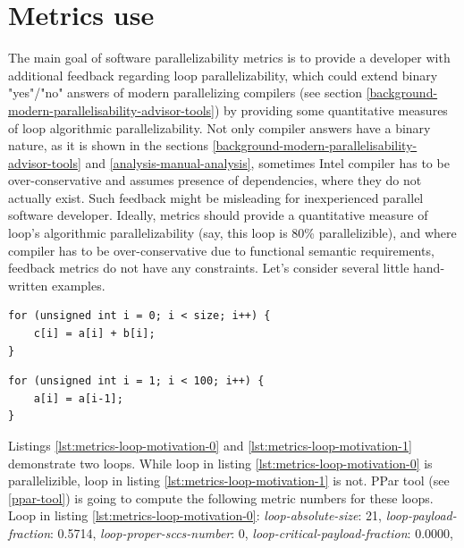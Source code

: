 \section{Metrics use}
\label{metrics-use}
\qquad The main goal of software parallelizability metrics is to provide a developer with additional feedback regarding loop parallelizability, which could extend binary "yes"/"no" answers of modern parallelizing compilers (see section \ref{background-modern-parallelisability-advisor-tools}) by providing some quantitative measures of loop algorithmic parallelizability. Not only compiler answers have a binary nature, as it is shown in the sections \ref{background-modern-parallelisability-advisor-tools} and \ref{analysis-manual-analysis}, sometimes Intel compiler has to be over-conservative and assumes presence of dependencies, where they do not actually exist. Such feedback might be misleading for inexperienced parallel software developer.\newline   
\null\qquad Ideally, metrics should provide a quantitative measure of loop's algorithmic parallelizability (say, this loop is 80\% parallelizible), and where compiler has to be over-conservative due to functional semantic requirements, feedback metrics do not have any constraints.\newline
\null\qquad Let's consider several little hand-written examples.  
\begin{lstlisting}[caption={Example of parallelizible loop. Intel compiler successfully parallelizes it.}, captionpos=b, label=lst:metrics-loop-motivation-0]
for (unsigned int i = 0; i < size; i++) {
	c[i] = a[i] + b[i];
}
\end{lstlisting}
\begin{lstlisting}[caption={Loop with true and anti cross iteration dependencies. Intel compiler detects dependency and refuses to parallelize the loop.}, captionpos=b, label=lst:metrics-loop-motivation-1]
for (unsigned int i = 1; i < 100; i++) {
	a[i] = a[i-1];
}
\end{lstlisting}
\null\qquad Listings \ref{lst:metrics-loop-motivation-0} and \ref{lst:metrics-loop-motivation-1} demonstrate two loops. While loop in listing \ref{lst:metrics-loop-motivation-0} is parallelizible, loop in listing \ref{lst:metrics-loop-motivation-1} is not. PPar tool (see \ref{ppar-tool}) is going to compute the following metric numbers for these loops.\newline
\null\qquad Loop in listing \ref{lst:metrics-loop-motivation-0}: \textit{loop-absolute-size}: 21, \textit{loop-payload-fraction}: 0.5714, \textit{loop-proper-sccs-number}: 0, \textit{loop-critical-payload-fraction}: 0.0000,

